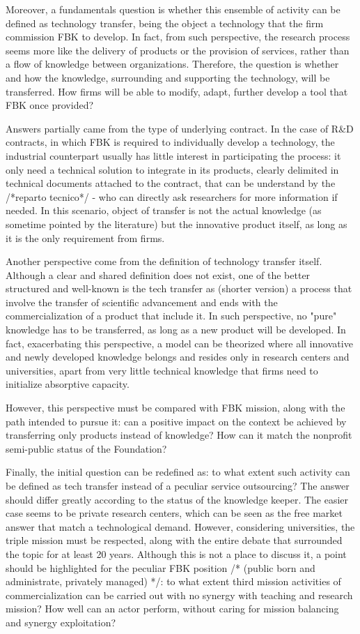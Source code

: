 Moreover, a fundamentals question is whether this ensemble of activity can be defined as technology transfer, being the object a technology that the firm commission FBK to develop. In fact, from such perspective, the research process seems more like the delivery of products or the provision of services, rather than a flow of knowledge between organizations. Therefore, the question is whether and how the knowledge, surrounding and supporting the technology, will be transferred. How firms will be able to modify, adapt, further develop a tool that FBK once provided?

Answers partially came from the type of underlying contract. In the case of R\&D contracts, in which FBK is required to individually develop a technology, the industrial counterpart usually has little interest in participating the process: it only need a technical solution to integrate in its products, clearly delimited in technical documents attached to the contract, that can be understand by the /*reparto tecnico*/ - who can directly ask researchers for more information if needed. In this scenario, object of transfer is not the actual knowledge (as sometime pointed by the literature) but the innovative product itself, as long as it is the only requirement from firms.

Another perspective come from the definition of technology transfer itself. Although a clear and shared definition does not exist, one of the better structured and well-known is the tech transfer as (shorter version) a process that involve the transfer of scientific advancement and ends with the commercialization of a product that include it. In such perspective, no "pure" knowledge has to be transferred, as long as a new product will be developed. In fact, exacerbating this perspective, a model can be theorized where all innovative and newly developed knowledge belongs and resides only in research centers and universities, apart from very little technical knowledge that firms need to initialize absorptive capacity. 

However, this perspective must be compared with FBK mission, along with the path intended to pursue it: can a positive impact on the context be achieved by transferring only products instead of knowledge? How can it match the nonprofit semi-public status of the Foundation? 

Finally, the initial question can be redefined as: to what extent such activity can be defined as tech transfer instead of a peculiar service outsourcing? The answer should differ greatly according to the status of the knowledge keeper. The easier case seems to be private research centers, which can be seen as the free market answer that match a technological demand. However, considering universities, the triple mission must be respected, along with the entire debate that surrounded the topic for at least 20 years. Although this is not a place to discuss it, a point should be highlighted for the peculiar FBK position /* (public born and administrate, privately managed) */: to what extent third mission activities of commercialization can be carried out with no synergy with teaching and research mission? How well can an actor perform, without caring for mission balancing and synergy exploitation?

